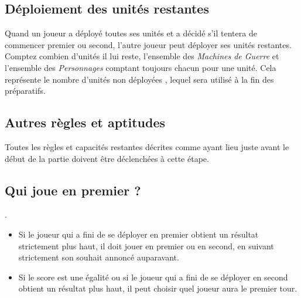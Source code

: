 \subsection*{Déploiement des unités restantes}

Quand un joueur a déployé toutes ses unités et a décidé s'il tentera de commencer premier ou second, l'autre joueur peut déployer ses unités restantes. Comptez combien d'unités il lui reste, l'ensemble des \emph{Machines de Guerre} et l'ensemble des \emph{Personnages} comptant toujours chacun pour une unité. Cela représente le \og nombre d'unités non déployées \fg , lequel sera utilisé à la fin des préparatifs.

\subsection*{Autres règles et aptitudes}

Toutes les règles et capacités restantes décrites comme ayant lieu juste avant le début de la partie doivent être déclenchées à cette étape.

\subsection*{Qui joue en premier ?}

.
\begin{itemize}[label={-}]
\item Si le joueur qui a fini de se déployer en premier obtient un résultat strictement plus haut, il doit jouer en premier ou en second, en suivant strictement son souhait annoncé auparavant.
\item Si le score est une égalité ou si le joueur qui a fini de se déployer en second obtient un résultat plus haut, il peut choisir quel joueur aura le premier tour.
\end{itemize}

